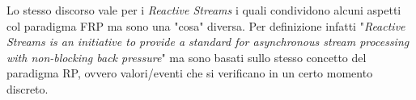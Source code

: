\documentclass[../main.tex]{subfiles}
\begin{document}
Lo stesso discorso vale per i \textit{Reactive Streams} i quali condividono alcuni aspetti col paradigma FRP ma sono una "cosa" diversa. Per definizione infatti "\textit{Reactive Streams is an initiative to provide a standard for asynchronous stream processing with non-blocking back pressure}" ma sono basati sullo stesso concetto del paradigma RP, ovvero valori/eventi che si verificano in un certo momento discreto.

\end{document}

